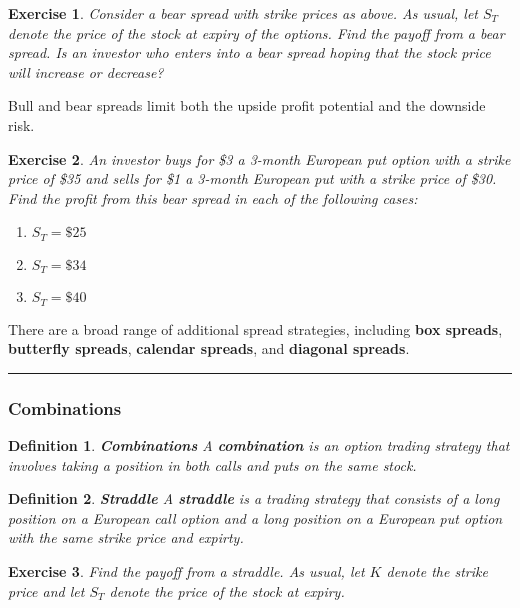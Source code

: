 \documentclass[letterpaper,10pt]{article}
\newtheorem{df}{Definition}[section]
\newtheorem{ex}{Exercise}
\begin{document}
\begin{ex}
Consider a bear spread with strike prices as above.  As usual, let $S_T$ denote the price of the stock at expiry of the options.  Find the payoff from a bear spread. Is an investor who enters into a bear spread hoping that the stock price will increase or decrease?
\end{ex}


\noindent Bull and bear spreads limit both the upside profit potential and the downside risk. 


\begin{ex}
An investor buys for \$3 a 3-month European put option with a strike price of \$35 and sells for \$1 a 3-month European put with a strike price of \$30. Find the profit from this bear spread in each of the following cases:
\begin{enumerate}
\item[(a)] $S_T=\$25$
\item[(b)] $S_T=\$34$
\item[(c)] $S_T=\$40$
\end{enumerate}
\end{ex}

\noindent There are a broad range of additional spread strategies, including {\bf box spreads}, {\bf butterfly spreads}, {\bf calendar spreads}, and {\bf diagonal spreads}.


\bigskip

\hrule

\bigskip



\subsubsection{Combinations}

\begin{df}{\bf Combinations}
A {\bf combination} is an option trading strategy that involves taking a position in both calls and puts on the same stock. 
\end{df}

\begin{df}{\bf Straddle}
A {\bf straddle} is a trading strategy that consists of a long position on a European call option and a long position on a European put option with the same strike price and expirty.
\end{df}


\begin{ex}
Find the payoff from a straddle.  As usual, let $K$ denote the strike price and let $S_T$ denote the price of the stock at expiry.
\end{ex}
\end{document}
